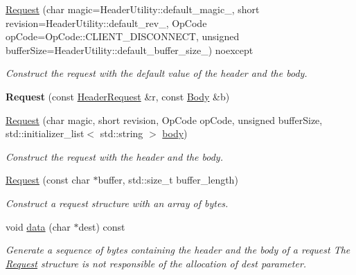 \begin{DoxyCompactItemize}
\item 
\mbox{\label{structprotocol_1_1serialize_1_1_request_a517a271b251e36dbe53f1921fb5b2a70}} 
\hyperlink{structprotocol_1_1serialize_1_1_request_a517a271b251e36dbe53f1921fb5b2a70}{Request} (char magic=Header\+Utility\+::default\+\_\+magic\+\_\+, short revision=Header\+Utility\+::default\+\_\+rev\+\_\+, Op\+Code op\+Code=Op\+Code\+::\+C\+L\+I\+E\+N\+T\+\_\+\+D\+I\+S\+C\+O\+N\+N\+E\+CT, unsigned buffer\+Size=Header\+Utility\+::default\+\_\+buffer\+\_\+size\+\_\+) noexcept
\begin{DoxyCompactList}\small\item\em Construct the request with the default value of the header and the body. \end{DoxyCompactList}\item 
\mbox{\label{structprotocol_1_1serialize_1_1_request_ab7fd322e03b2f5cffa88b8d5d3b095cc}} 
{\bfseries Request} (const \hyperlink{structprotocol_1_1serialize_1_1_header_request}{Header\+Request} \&r, const \hyperlink{classprotocol_1_1serialize_1_1_body}{Body} \&b)
\item 
\hyperlink{structprotocol_1_1serialize_1_1_request_aa28a7123b7211e298337a179b1db4ffb}{Request} (char magic, short revision, Op\+Code op\+Code, unsigned buffer\+Size, std\+::initializer\+\_\+list$<$ std\+::string $>$ \hyperlink{structprotocol_1_1serialize_1_1_request_a657ae52f93238a2b11a8c1d65c89d358}{body})
\begin{DoxyCompactList}\small\item\em Construct the request with the header and the body. \end{DoxyCompactList}\item 
\hyperlink{structprotocol_1_1serialize_1_1_request_a1515d41f0b57dd7aa802841aa59c90ae}{Request} (const char $\ast$buffer, std\+::size\+\_\+t buffer\+\_\+length)
\begin{DoxyCompactList}\small\item\em Construct a request structure with an array of bytes. \end{DoxyCompactList}\item 
void \hyperlink{structprotocol_1_1serialize_1_1_request_a809c0497125ba797f29c942b29ed9177}{data} (char $\ast$dest) const
\begin{DoxyCompactList}\small\item\em Generate a sequence of bytes containing the header and the body of a request The \hyperlink{structprotocol_1_1serialize_1_1_request}{Request} structure is not responsible of the allocation of dest parameter. \end{DoxyCompactList}\item 

\end{DoxyCompactItemize}

